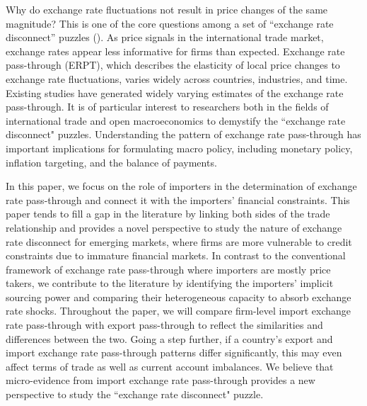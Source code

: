 \documentclass[12pt]{article}
\begin{document}
Why do exchange rate fluctuations not result in price changes of the same magnitude? This is one of the core questions among a set of ``exchange rate disconnect'' puzzles (\cite{obstfeld2000}). As price signals in the international trade market, exchange rates appear less informative for firms than expected. Exchange rate pass-through (ERPT), which describes the elasticity of local price changes to exchange rate fluctuations, varies widely across countries, industries, and time. Existing studies have generated widely varying estimates of the exchange rate pass-through. It is of particular interest to researchers both in the fields of international trade and open macroeconomics to demystify the ``exchange rate disconnect" puzzles. Understanding the pattern of exchange rate pass-through has important implications for formulating macro policy, including monetary policy, inflation targeting, and the balance of payments.

In this paper, we focus on the role of importers in the determination of exchange rate pass-through and connect it with the importers' financial constraints. This paper tends to fill a gap in the literature by linking both sides of the trade relationship and provides a novel perspective to study the nature of exchange rate disconnect for emerging markets, where firms are more vulnerable to credit constraints due to immature financial markets. In contrast to the conventional framework of exchange rate pass-through where importers are mostly price takers, we contribute to the literature by identifying the importers' implicit sourcing power and comparing their heterogeneous capacity to absorb exchange rate shocks. Throughout the paper, we will compare firm-level import exchange rate pass-through with export pass-through to reflect the similarities and differences between the two. Going a step further, if a country's export and import exchange rate pass-through patterns differ significantly, this may even affect terms of trade as well as current account imbalances. We believe that micro-evidence from import exchange rate pass-through provides a new perspective to study the ``exchange rate disconnect" puzzle.
\end{document}
